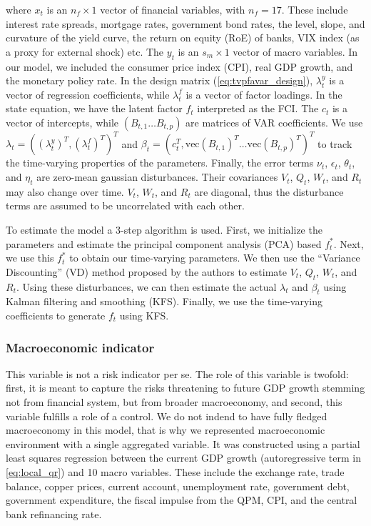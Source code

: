 \documentclass[12pt,a4paper]{article}
\begin{document}
where $x_t$ is an $n_f\times1$ vector of financial variables, with $n_f=17$. These include interest rate spreads, mortgage rates, government bond rates, the level, slope, and curvature of the yield curve, the return on equity (RoE) of banks, VIX index (as a proxy for external shock) etc. The $y_t$ is an $s_m\times1$ vector of macro variables. In our model, we included the consumer price index (CPI), real GDP growth, and the monetary policy rate. In the design matrix (\autoref{eq:tvpfavar_design}), $\lambda_t^y$ is a vector of regression coefficients, while $\lambda_t^f$ is a vector of factor loadings. In the state equation, we have the latent factor $f_t$ interpreted as the FCI. The $c_t$ is a vector of intercepts, while $(B_{t,1} \dots B_{t,p})$ are matrices of VAR coefficients. We use $\lambda_t=\left((\lambda_t^y)^T,(\lambda_t^f)^T \right)^T$ and $\beta_t=\left(c_t^T,\text{vec}(B_{t,1})^T \dots \text{vec}(B_{t,p})^T\right)^T$ to track the time-varying properties of the parameters. Finally, the error terms $\nu_t$, $\epsilon_t$, $\theta_t$, and $\eta_t$ are zero-mean gaussian disturbances. Their covariances $V_t$, $Q_t$, $W_t$, and $R_t$ may also change over time. $V_t$, $W_t$, and $R_t$ are diagonal, thus the disturbance terms are assumed to be uncorrelated with each other.

To estimate the model a 3-step algorithm is used. First, we initialize the parameters and estimate the principal component analysis (PCA) based $f_t^*$. Next, we use this $f_t^*$ to obtain our time-varying parameters. We then use the ``Variance Discounting'' (VD) method proposed by the authors \citep{koop_2013} to estimate $V_t$, $Q_t$, $W_t$, and $R_t$. Using these disturbances, we can then estimate the actual $\lambda_t$ and $\beta_t$ using Kalman filtering and smoothing (KFS). Finally, we use the time-varying coefficients to generate $f_t$ using KFS.


\subsubsection{Macroeconomic indicator}
This variable is not a risk indicator per se. The role of this variable is twofold: first, it is meant to capture the risks threatening to future GDP growth stemming not from financial system, but from broader macroeconomy, and second, this variable fulfills a role of a control. We do not indend to have fully fledged macroeconomy in this model, that is why we represented macroeconomic environment with a single aggregated variable. It was constructed using a partial least squares regression between the current GDP growth (autoregressive term in \autoref{eq:local_qr}) and 10 macro variables. These include the exchange rate, trade balance, copper prices, current account, unemployment rate, government debt, government expenditure, the fiscal impulse from the QPM, CPI, and the central bank refinancing rate. 
\end{document}
